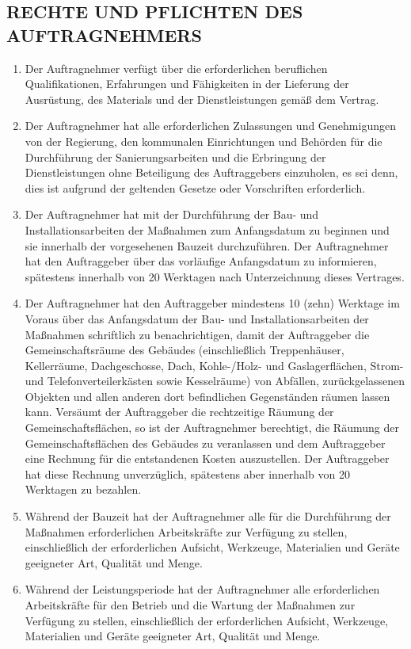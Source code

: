 \begin{multicols}{2}
 \subsection{RECHTE UND PFLICHTEN DES AUFTRAGNEHMERS}
  \begin{enumerate}
   \item Der Auftragnehmer verfügt über die erforderlichen beruflichen Qualifikationen, Erfahrungen und Fähigkeiten in der Lieferung der Ausrüstung, des Materials und der Dienstleistungen gemäß dem Vertrag.
   \item Der Auftragnehmer hat alle erforderlichen Zulassungen und Genehmigungen von der Regierung, den kommunalen Einrichtungen und Behörden für die Durchführung der Sanierungsarbeiten und die Erbringung der Dienstleistungen ohne Beteiligung des Auftraggebers einzuholen, es sei denn, dies ist aufgrund der geltenden Gesetze oder Vorschriften erforderlich.
   \item Der Auftragnehmer hat mit der Durchführung der Bau- und Installationsarbeiten der Maßnahmen zum Anfangsdatum zu beginnen und sie innerhalb der vorgesehenen Bauzeit durchzuführen. Der Auftragnehmer hat den Auftraggeber über das vorläufige Anfangsdatum zu informieren, spätestens innerhalb von 20 Werktagen nach Unterzeichnung dieses Vertrages.
   \item Der Auftragnehmer hat den Auftraggeber mindestens 10 (zehn) Werktage im Voraus über das Anfangsdatum der Bau- und Installationsarbeiten der Maßnahmen schriftlich zu benachrichtigen, damit der Auftraggeber die Gemeinschaftsräume des Gebäudes (einschließlich Treppenhäuser, Kellerräume, Dachgeschosse, Dach, Kohle-/Holz- und Gaslagerflächen, Strom- und Telefonverteilerkästen sowie Kesselräume) von Abfällen, zurückgelassenen Objekten und allen anderen dort befindlichen Gegenständen räumen lassen kann. Versäumt der Auftraggeber die rechtzeitige Räumung der Gemeinschaftsflächen, so ist der Auftragnehmer berechtigt, die Räumung der Gemeinschaftsflächen des Gebäudes zu veranlassen und dem Auftraggeber eine Rechnung für die entstandenen Kosten auszustellen. Der Auftraggeber hat diese Rechnung unverzüglich, spätestens aber innerhalb von 20 Werktagen zu bezahlen.
   \item Während der Bauzeit hat der Auftragnehmer alle für die Durchführung der Maßnahmen erforderlichen Arbeitskräfte zur Verfügung zu stellen, einschließlich der erforderlichen Aufsicht, Werkzeuge, Materialien und Geräte geeigneter Art, Qualität und Menge.
   \item Während der Leistungsperiode hat der Auftragnehmer alle erforderlichen Arbeitskräfte für den Betrieb und die Wartung der Maßnahmen zur Verfügung zu stellen, einschließlich der erforderlichen Aufsicht, Werkzeuge, Materialien und Geräte geeigneter Art, Qualität und Menge.

\end{enumerate}
\end{multicols}
